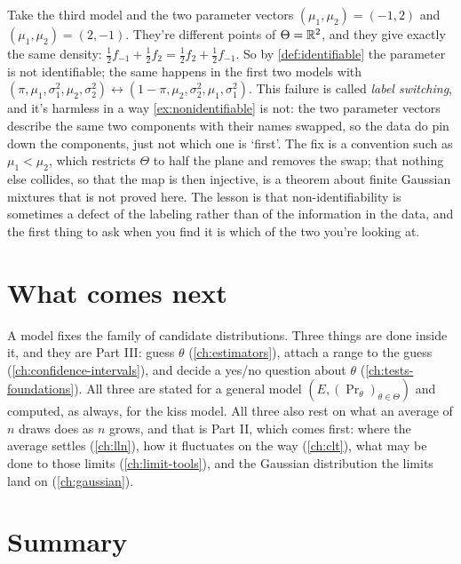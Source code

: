 \begin{pitfall}
Take the third model and the two parameter vectors $(\mu_1, \mu_2) = (-1, 2)$ and $(\mu_1, \mu_2) = (2, -1)$.
They're different points of $\Theta = \mathbb{R}^2$, and they give exactly the same density: $\frac12 f_{-1} + \frac12 f_{2} = \frac12 f_{2} + \frac12 f_{-1}$.
So by \cref{def:identifiable} the parameter is not identifiable; the same happens in the first two models with $(\pi, \mu_1, \sigma_1^2, \mu_2, \sigma_2^2) \leftrightarrow (1-\pi, \mu_2, \sigma_2^2, \mu_1, \sigma_1^2)$.
This failure is called \textit{label switching}, and it's harmless in a way \cref{ex:nonidentifiable} is not: the two parameter vectors describe the same two components with their names swapped, so the data do pin down the components, just not which one is `first'.
The fix is a convention such as $\mu_1 < \mu_2$, which restricts $\Theta$ to half the plane and removes the swap; that nothing else collides, so that the map is then injective, is a theorem about finite Gaussian mixtures that is not proved here.
The lesson is that non-identifiability is sometimes a defect of the labeling rather than of the information in the data, and the first thing to ask when you find it is which of the two you're looking at.
\end{pitfall}

\section{What comes next}
\label{sec:models-next}

A model fixes the family of candidate distributions.
Three things are done inside it, and they are Part III: guess $\theta$ (\cref{ch:estimators}), attach a range to the guess (\cref{ch:confidence-intervals}), and decide a yes/no question about $\theta$ (\cref{ch:tests-foundations}).
All three are stated for a general model $(E, (\Pr_\theta)_{\theta \in \Theta})$ and computed, as always, for the kiss model.
All three also rest on what an average of $n$ draws does as $n$ grows, and that is Part II, which comes first: where the average settles (\cref{ch:lln}), how it fluctuates on the way (\cref{ch:clt}), what may be done to those limits (\cref{ch:limit-tools}), and the Gaussian distribution the limits land on (\cref{ch:gaussian}).

\section{Summary}
\label{sec:models-summary}

